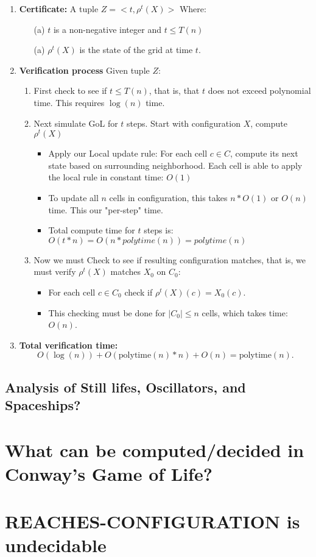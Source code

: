 \documentclass{article}
\theoremstyle{definition}
\theoremstyle{plain}
\theoremstyle{plain}
\begin{document}
\begin{enumerate}
    \item \textbf{Certificate:} A tuple $Z = <t, \rho^t(X) >$
      Where: 
      \begin{enumerate}
          \item[(a)] $t$ is a non-negative integer and $t \leq T(n)$
          \item[(a)] $\rho^t(X)$ is the state of the grid at time $t$.
      \end{enumerate}

    \item \textbf{Verification process} Given tuple $Z$:
    \begin{enumerate}
        \item First check to see if $t \leq T(n)$, that is, that $t$ does not exceed polynomial time. This requires $\log(n)$ time.
        \item Next simulate GoL for $t$ steps. Start with configuration $X$, compute $\rho^t(X)$
        \begin{itemize}
            \item Apply our Local update rule: For each cell $c \in C$, compute its next state based on surrounding neighborhood. Each cell is able to apply the local rule in constant time: $O(1)$
            \item To update all $n$ cells in configuration, this takes $n*O(1)$ or $O(n)$ time. This our "per-step" time.
            \item Total compute time for $t$ steps is: $O(t * n) = O(n * polytime(n)) = polytime(n)$ 
        \end{itemize}
        \item Now we must Check to see if resulting configuration matches, that is, we must verify $\rho^t(X)$  matches $X_0$ on $C_0$:
        \begin{itemize}
            \item For each cell $c \in C_0$ check if $\rho^t(X)(c) = X_0(c)$.
            \item This checking must be done for $ |C_0| \leq n $ cells, which takes time: $ O(n) $.
        \end{itemize}
    \end{enumerate}

    \item \textbf{Total verification time: }
      \begin{equation}
        O(\log(n))+O(\text{polytime}(n)*n)+O(n)=\text{polytime}(n).
    \end{equation}

\end{enumerate}



\subsection{Analysis of Still lifes, Oscillators, and Spaceships?}


\section{What can be computed/decided in Conway’s Game of Life?}

\section{REACHES-CONFIGURATION is undecidable}

\printbibliography
\end{document}
